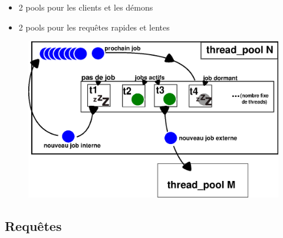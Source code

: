 \documentclass{beamer}
\begin{document}
\begin{frame}
    \begin{itemize}
        \item 2 pools pour les clients et les démons
        \item 2 pools pour les requêtes rapides et lentes
    \end{itemize}
\begin{center}
\begin{figure}[htbp]
    \centering
    \includegraphics[scale=0.6]{thread_pool.eps}
\end{figure}
\end{center}

\end{frame}

\begin{frame}
    \section{Requêtes}
\end{frame}
\end{document}
